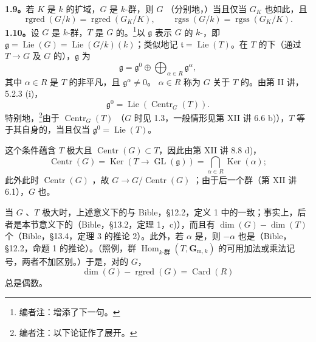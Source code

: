 \textbf{1.9。}若 $K$ 是 $k$ 的扩域，$G$ 是 $k$-群，则 $G$ （分别地，）当且仅当 $G_K$ 也如此，且
\[
\operatorname{rgred}(G/k)=\operatorname{rgred}(G_K/K),\qquad
\operatorname{rgss}(G/k)=\operatorname{rgss}(G_K/K).
\]
\textbf{1.10。}设 $G$ 是 $k$-群，$T$ 是 $G$ 的。\footnote[9]{编者注：增添了下一句。}以 $\mathfrak g$ 表示 $G$ 的 $k$-，即 $\mathfrak g=\operatorname{Lie}(G)=\operatorname{Lie}(G/k)(k)$；类似地记 $\mathfrak t=\operatorname{Lie}(T)$。在 $T$ 的下（通过 $T\to G$ 及 $G$ 的），$\mathfrak g$ 为
\begin{equation}
\mathfrak g=\mathfrak g^0\oplus\bigoplus_{\alpha\in R}\mathfrak g^\alpha,\tag{1.10.1}
\end{equation}
其中 $\alpha\in R$ 是 $T$ 的非平凡，且 $\mathfrak g^\alpha\ne0$。 $\alpha\in R$ 称为 $G$ 关于 $T$ 的。由第 II 讲，5.2.3 (i)，
\begin{equation}
\mathfrak g^0=\operatorname{Lie}(\operatorname{Centr}_G(T)).\tag{1.10.2}
\end{equation}
特别地，\footnote[10]{编者注：以下论证作了展开。}由于 $\operatorname{Centr}_G(T)$ （$G$ 时见 1.3，一般情形见第 XII 讲 6.6 b)），$T$ 等于其自身的，当且仅当 $\mathfrak g^0=\operatorname{Lie}(T)$。

这个条件蕴含 $T$ 极大且 $\operatorname{Centr}(G)\subset T$，因此由第 XII 讲 8.8 d)，
\begin{equation}
\operatorname{Centr}(G)=\operatorname{Ker}(T\to\operatorname{GL}(\mathfrak g))=\bigcap_{\alpha\in R}\operatorname{Ker}(\alpha);\tag{1.10.3}
\end{equation}
此外此时 $\operatorname{Centr}(G)$ ，故 $G\to G/\operatorname{Centr}(G)$ ；由于后一个群（第 XII 讲 6.1），$G$ 也。

当 $G$ 、$T$ 极大时，上述意义下的与 Bible，\S 12.2，定义 1 中的一致；事实上，后者是本节意义下的（Bible，\S 13.2，定理 1，c)），而且有 $\dim(G)-\dim(T)$ 个（Bible，\S 13.4，定理 3 的推论 2）。此外，若 $\alpha$ 是，则 $-\alpha$ 也是（Bible，\S 12.2，命题 1 的推论）。（照例，群 $\operatorname{Hom}_{k\text{-群}}(T,\mathbf G_{\mathrm m,k})$ 的可用加法或乘法记号，两者不加区别。）于是，对的 $G$，
\begin{equation}
\dim(G)-\operatorname{rgred}(G)=\operatorname{Card}(R)\tag{1.10.4}
\end{equation}
总是偶数。

